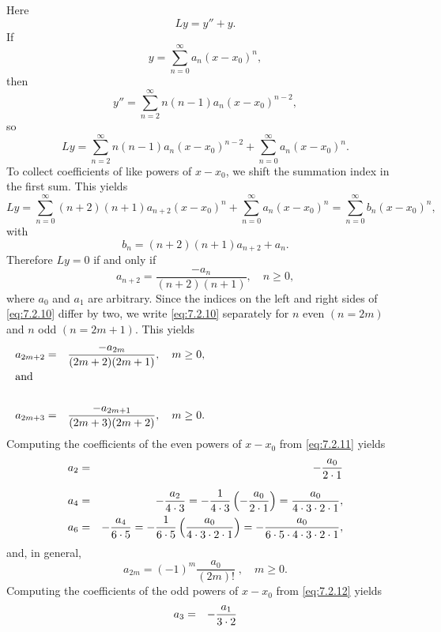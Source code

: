 \begin{examplesolution}
\solution Here
\[
  Ly=y''+y.
\]
If
\[
  y=\sum_{n=0}^{\infty}a_{n}(x-x_{0})^{n},
\]
then
\[
  y''=\sum_{n=2}^{\infty}n(n-1)a_{n}(x-x_{0})^{n-2},
\]
so
\[
  Ly=\sum_{n=2}^{\infty}n(n-1)a_{n}(x-x_{0})^{n-2}+\sum_{n=0}^{\infty}a_{n}(x-x_{0})^{n}.
\]
To collect coefficients of like powers of $x-x_{0}$, we shift the summation index in the first sum.
This yields
\[
  Ly=\sum^{\infty}_{n=0}(n+2)(n+1)a_{n+2}(x-x_{0})^{n}+ \sum^{\infty}_{n=0}a_{n}(x-x_{0})^{n}=\sum^{\infty}_{n=0}b_{n}(x-x_{0})^{n},
\]
with
\[
  b_{n}=(n+2)(n+1)a_{n+2}+a_{n}.
\]
Therefore $Ly=0$ if and only if
\begin{equation}
  \label{eq:7.2.10}a_{n+2}=\frac{-a_{n}}{(n+2)(n+1)},\quad n\ge0,
\end{equation}
where $a_{0}$ and $a_{1}$ are arbitrary. Since the indices on the left and right sides of
\eqref{eq:7.2.10} differ by two, we write \eqref{eq:7.2.10} separately for $n$ even $(n=2m)$ and $n$
odd $(n=2m+1)$. This yields
\begin{eqnarray}
  a_{2m+2}&=&\frac{-a_{2m}}{(2m+2)(2m+1)},\quad m\ge0, \label{eq:7.2.11} \\%
  \noalign{\hspace*{-15pt}\mbox{and}}\nonumber\\ a_{2m+3}&=&\frac{-a_{2m+1}}{(2m+3)(2m+2)},\quad m\ge0. \label{eq:7.2.12}
\end{eqnarray}
Computing the coefficients of the even powers of $x-x_{0}$ from \eqref{eq:7.2.11} yields
\begin{eqnarray*}
  a_{2} & = & -\frac{a_{0}}{2\cdot1}                                                                                          \\[2\jot]
  a_{4} & = & -\frac{a_{2}}{4\cdot3}=-\frac{1}{4\cdot3}\left(-\frac{a_{0}}{2\cdot1}\right)=\frac{a_{0}}{4\cdot3\cdot2\cdot1}, \\
  a_{6} & = & -\frac{a_{4}}{6\cdot5}=-\frac{1}{6\cdot5}\left(\frac{a_{0}}{4\cdot3\cdot2\cdot1}\right)=-\frac{a_{0}}{6\cdot5\cdot4\cdot3\cdot2\cdot1},
\end{eqnarray*}
and, in general,
\begin{equation}
  \label{eq:7.2.13}a_{2m}=(-1)^{m}\frac{a_{0}}{(2m)!}\;,\quad m\ge0.
\end{equation}
Computing the coefficients of the odd powers of $x-x_{0}$ from \eqref{eq:7.2.12} yields
\begin{eqnarray*}
  a_{3} & = & -\frac{a_{1}}{3\cdot2}                                                                                          \\[2\jot]

\end{eqnarray*}
\end{examplesolution}
